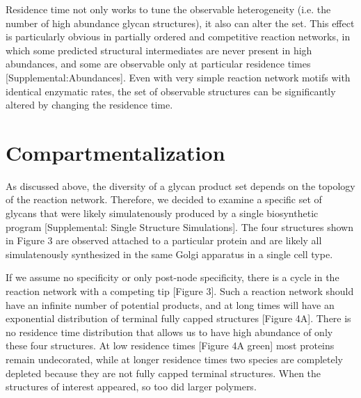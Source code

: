 \documentclass[twocolumn]{article}
\begin{document}
Residence time not only works to tune the observable heterogeneity (i.e. the number of high abundance glycan structures), it also can alter the set. This effect is particularly obvious in partially ordered and competitive reaction networks, in which some predicted structural intermediates are never present in high abundances, and some are observable only at particular residence times [Supplemental:Abundances]. Even with very simple reaction network motifs with identical enzymatic rates, the set of observable structures can be significantly altered by changing the residence time.\\



\section*{Compartmentalization}
As discussed above, the diversity of a glycan product set depends on the topology of the reaction network. Therefore, we decided to examine a specific set of glycans that were likely simulatenously produced by a single biosynthetic program [Supplemental: Single Structure Simulations]. The four structures shown in Figure 3 are observed attached to a particular protein \cite{Hard1992} and are likely all simulatenously synthesized in the same Golgi apparatus in a single cell type. 

If we assume no specificity or only post-node specificity, there is a cycle in the reaction network with a competing tip [Figure 3]. Such a reaction network should have an infinite number of potential products, and at long times will have an exponential distribution of terminal fully capped structures [Figure 4A]. There is no residence time distribution that allows us to have high abundance of only these four structures. At low residence times [Figure 4A green] most proteins remain undecorated, while at longer residence times two species are completely depleted because they are not fully capped terminal structures. When the structures of interest appeared, so too did larger polymers. 
\end{document}
